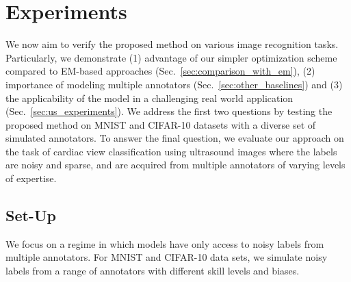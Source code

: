 \section{Experiments}

We now aim to verify the proposed method on various image recognition tasks. Particularly, we demonstrate (1) advantage of our simpler optimization scheme compared to EM-based approaches (Sec.~\ref{sec:comparison_with_em}), (2) importance of modeling multiple annotators (Sec.~\ref{sec:other_baselines}) and (3) the applicability of the model in a challenging real world application (Sec.~\ref{sec:us_experiments}). We address the first two questions by testing the proposed method on MNIST and CIFAR-10 datasets with a diverse set of simulated annotators. To answer the final question, we evaluate our approach on the task of cardiac view classification using ultrasound images where the labels are noisy and sparse, and are acquired from multiple annotators of varying levels of expertise. 



\subsection{Set-Up}
We focus on a regime in which models have only access to noisy labels from multiple annotators. For MNIST and CIFAR-10 data sets, we simulate noisy labels from a range of annotators with different skill levels and biases.

